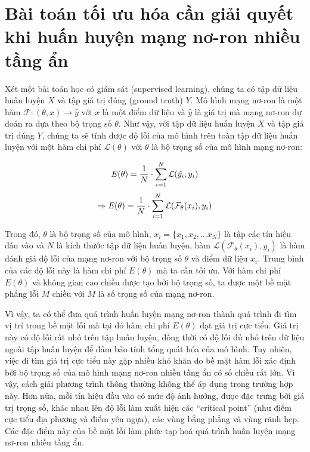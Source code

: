 \section{Bài toán tối ưu hóa cần giải quyết khi huấn huyện mạng nơ-ron nhiều tầng ẩn}

Xét một bài toán học có giám sát (supervised learning), chúng ta có tập dữ liệu huấn luyện $X$ và tập giá trị đúng (ground truth) $Y$. Mô hình mạng nơ-ron là một hàm $\mathcal{F}: (\theta, x) \rightarrow \hat{y}$ với $x$ là một điểm dữ liệu và $\hat{y}$ là giá trị mà mạng nơ-ron dự đoán ra dựa theo bộ trọng số $\theta$. Như vậy, với tập dữ liệu huấn luyện $X$ và tập giá trị đúng $Y$, chúng ta sẽ tính được độ lỗi của mô hình trên toàn tập dữ liệu huấn luyện với một hàm chi phí $\mathcal{L}(\theta)$ với $\theta$ là bộ trọng số của mô hình mạng nơ-ron:

\begin{equation}
	\label{eqn:E-y}
	\mathbf{\it{E}(\theta)} = \frac{1}{N}\cdot \sum_{i=1}^{N}\mathcal{L}(\hat{y_i}, y_i)
\end{equation}
\begin{equation}
	\label{eqn:E-Fx}
	\Rightarrow \mathbf{\it{E}(\theta)} = \frac{1}{N}\cdot \sum_{i=1}^{N}\mathcal{L}(\mathcal{F}_\theta( x_i), y_i)
\end{equation}

Trong đó, $\theta$ là bộ trọng số của mô hình, $x_i = \{x_1, x_2,...x_N\}$ là tập các tín hiệu đầu vào và $N$ là kích thước tập dữ liệu huấn luyện, hàm $\mathcal{L}(\mathcal{F}_\theta( x_i), y_i)$ là hàm đánh giá độ lỗi của mạng nơ-ron với bộ trọng số $\theta$ và điểm dữ liệu $x_i$. Trung bình của các độ lỗi này là hàm chi phí $E(\theta)$ mà ta cần tối ưu. Với hàm chi phí $E(\theta)$ và không gian cao chiều được tạo bởi bộ trọng số, ta được một bề mặt phẳng lỗi $M$ chiều với $M$ là số trọng số của mạng nơ-ron.

Vì vậy, ta có thể đưa quá trình huấn luyện mạng nơ-ron thành quá trình đi tìm vị trí trong bề mặt lỗi mà tại đó hàm chi phí $E(\theta)$ đạt giá trị cực tiểu. Giá trị này có độ lỗi rất nhỏ trên tập huấn luyện, đồng thời có độ lỗi đủ nhỏ trên dữ liệu ngoài tập huấn luyện để đảm bảo tính tổng quát hóa của mô hình. Tuy nhiên, việc đi tìm giá trị cực tiểu này gặp nhiều khó khăn do bề mặt hàm lỗi xác định bởi bộ trọng số của mô hình mạng nơ-ron nhiều tầng ẩn có số chiều rất lớn. Vì vậy, cách giải phương trình thông thường không thể áp dụng trong trường hợp này. Hơn nữa, mỗi tín hiệu đầu vào có mức độ ảnh hưởng, được đặc trưng bởi giá trị trọng số, khác nhau lên độ lỗi làm xuất hiện các ``critical point'' (như điểm cực tiểu địa phương và điểm yên ngựa), các vùng bằng phẳng và vùng rãnh hẹp. Các đặc điểm này của bề mặt lỗi làm phức tạp hoá quá trình huấn luyện mạng nơ-ron nhiều tầng ẩn.

